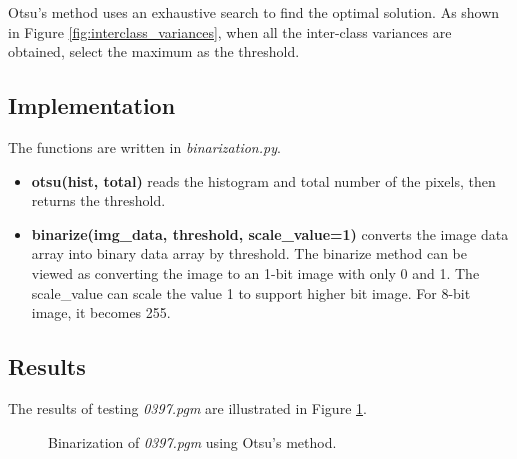 \documentclass[paper=a4, fontsize=11pt]{scrartcl}
\numberwithin{equation}{section}		%
\numberwithin{figure}{section}			%
\numberwithin{table}{section}				%
\begin{document}
Otsu's method uses an exhaustive search to find the optimal solution.
As shown in Figure \ref{fig:interclass_variances}, when all the inter-class variances are obtained, select the maximum as the threshold.

\subsection{Implementation}

The functions are written in \emph{binarization.py}.

\begin{itemize}
\item \textbf{ otsu(hist, total) } reads the histogram and total number of the pixels, then returns the threshold.
\item \textbf{ binarize(img\_data, threshold, scale\_value=1) } converts the image data array into binary data array by threshold.
The binarize method can be viewed as converting the image to an 1-bit image with only 0 and 1.
The scale\_value can scale the value 1 to support higher bit image.
For 8-bit image, it becomes 255.
\end{itemize}

\subsection{Results}


The results of testing \emph{0397.pgm} are illustrated in Figure \ref{fig:binary:01}.

\begin{figure}[h]
\centering
{}
\caption{Binarization of \emph{0397.pgm} using Otsu's method.}\label{fig:binary:01}
\end{figure}
\end{document}
